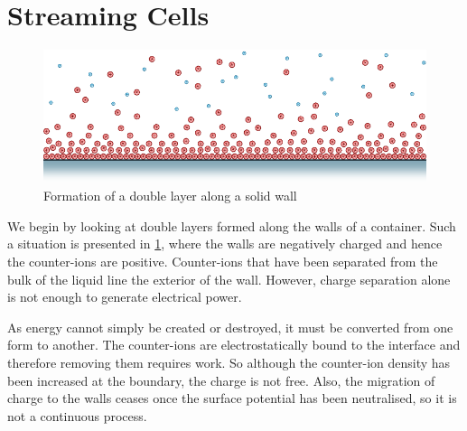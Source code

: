 
\section{Streaming Cells}
  \begin{figure}
      \centering
      \includegraphics{content/pt1/01-PowerHarvesting/graphics/intro_2_wall}
      \caption{\label{fig:doubleLayerBetweenWalls}Formation of a double layer along a solid wall}
  \end{figure}

  We begin by looking at double layers formed along the walls of a container.
  Such a situation is presented in \ref{fig:doubleLayerBetweenWalls}, where the walls are negatively charged and hence the counter-ions are positive.
  Counter-ions that have been separated from the bulk of the liquid line the exterior of the wall.
  However, charge separation alone is not enough to generate electrical power.

  As energy cannot simply be created or destroyed, it must be converted from one form to another.
  The counter-ions are electrostatically bound to the interface and therefore removing them requires work.
  So although the counter-ion density has been increased at the boundary, the charge is not free.
  Also, the migration of charge to the walls ceases once the surface potential has been neutralised, so it is not a continuous process.

